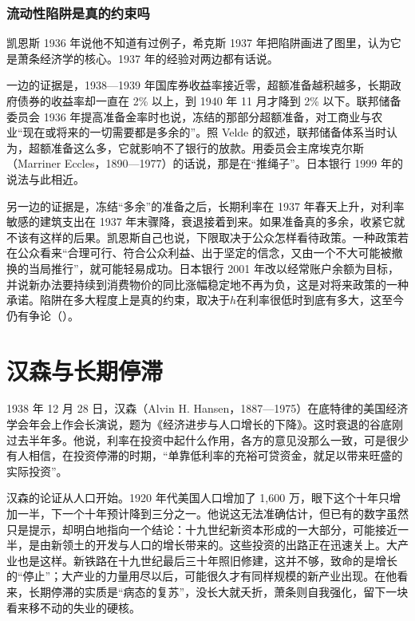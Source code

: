 \subsubsection{流动性陷阱是真的约束吗}
凯恩斯 1936 年说他不知道有过例子，希克斯 1937 年把陷阱画进了图里，认为它是萧条经济学的核心\cite{keynes1936,hicks1937}。1937 年的经验对两边都有话说。

一边的证据是，1938—1939 年国库券收益率接近零，超额准备越积越多，长期政府债券的收益率却一直在 2\% 以上，到 1940 年 11 月才降到 2\% 以下\cite{bms1943b}。联邦储备委员会 1936 年提高准备金率时也说，冻结的那部分超额准备，对工商业与农业“现在或将来的一切需要都是多余的”\cite{frb1936aug}。照 Velde 的叙述，联邦储备体系当时认为，超额准备这么多，它就影响不了银行的放款。用委员会主席埃克尔斯（Marriner Eccles，1890—1977）的话说，那是在“推绳子”\cite{velde2009,loc33}。日本银行 1999 年的说法与此相近\cite{boj1999b}。

另一边的证据是，冻结“多余”的准备之后，长期利率在 1937 年春天上升，对利率敏感的建筑支出在 1937 年末骤降，衰退接着到来\cite{bms1943b,romer1992}。如果准备真的多余，收紧它就不该有这样的后果。凯恩斯自己也说，下限取决于公众怎样看待政策。一种政策若在公众看来“合理可行、符合公众利益、出于坚定的信念，又由一个不大可能被撤换的当局推行”，就可能轻易成功\cite{keynes1936}。日本银行 2001 年改以经常账户余额为目标，并说新办法要持续到消费物价的同比涨幅稳定地不再为负\cite{boj2001}，这是对将来政策的一种承诺。陷阱在多大程度上是真的约束，取决于$h$在利率很低时到底有多大，这至今仍有争论（）。

\section{汉森与长期停滞}\label{sec:islm-hansen}

1938 年 12 月 28 日，汉森（Alvin H. Hansen，1887—1975）在底特律的美国经济学会年会上作会长演说，题为《经济进步与人口增长的下降》\cite{hansen1939,loc33}。这时衰退的谷底刚过去半年多。他说，利率在投资中起什么作用，各方的意见没那么一致，可是很少有人相信，在投资停滞的时期，“单靠低利率的充裕可贷资金，就足以带来旺盛的实际投资”\cite{hansen1939}。

汉森的论证从人口开始。1920 年代美国人口增加了 1,600 万，眼下这个十年只增加一半，下一个十年预计降到三分之一\cite{hansen1939}。他说这无法准确估计，但已有的数字虽然只是提示，却明白地指向一个结论：十九世纪新资本形成的一大部分，可能接近一半，是由新领土的开发与人口的增长带来的\cite{hansen1939}。这些投资的出路正在迅速关上\cite{hansen1939}。大产业也是这样。新铁路在十九世纪最后三十年照旧修建，这并不够，致命的是增长的“停止”；大产业的力量用尽以后，可能很久才有同样规模的新产业出现\cite{hansen1939}。在他看来，长期停滞的实质是“病态的复苏”，没长大就夭折，萧条则自我强化，留下一块看来移不动的失业的硬核\cite{hansen1939}。

